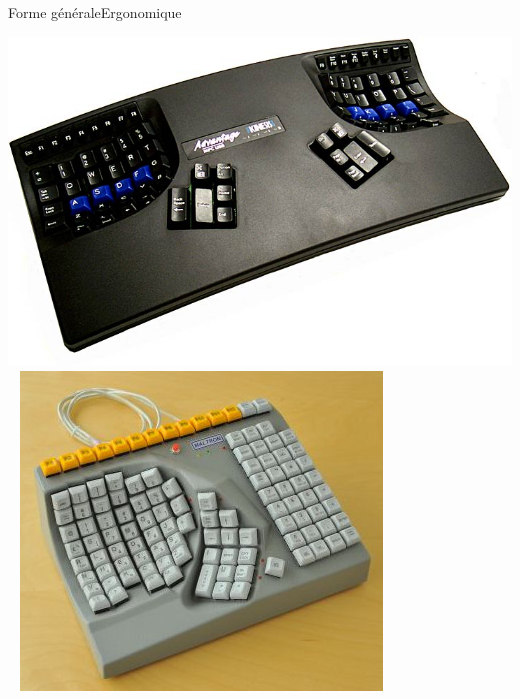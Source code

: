 \begin{frame}{Forme générale}{Ergonomique}
	\begin{center}
		\includegraphics[scale=0.25]{images/hard_kinesis} ~
		\includegraphics[scale=0.4]{images/hard_maltron}
	\end{center}
\end{frame}

